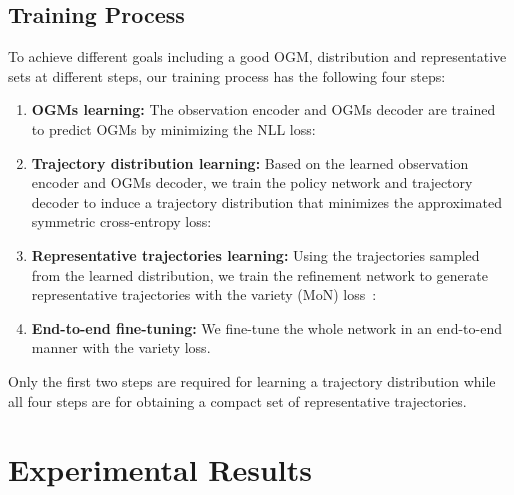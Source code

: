 \documentclass[10pt,twocolumn,letterpaper]{article}
\begin{document}
\subsection{Training Process}

To achieve different goals including a good OGM, distribution and representative sets at different steps, our training process has the following four steps:

\begin{enumerate}
\vspace{-0.2cm}
\itemsep=-5pt
\item \textbf{OGMs learning:} The observation encoder and OGMs decoder are trained to predict OGMs by minimizing the NLL loss:


\item \textbf{Trajectory distribution learning:} Based on the learned observation encoder and OGMs decoder, we train the policy network and trajectory decoder to induce a trajectory distribution that minimizes the approximated symmetric cross-entropy loss:


\item \textbf{Representative trajectories learning:} Using the trajectories sampled from the learned distribution, we train the refinement network to generate representative trajectories with the variety (MoN) loss~\cite{gupta2018social}:


\item \textbf{End-to-end fine-tuning:} We fine-tune the whole network in an end-to-end manner with the variety loss.
\vspace{-0.2cm}

\end{enumerate}

Only the first two steps are required for learning a trajectory distribution while all four steps are for obtaining a compact set of representative trajectories.

\section{Experimental Results}
\label{sec:experiment}
\end{document}
